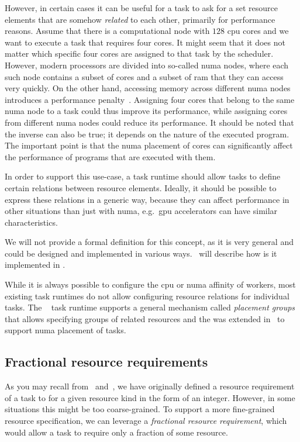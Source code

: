 However, in certain cases it can be useful for a task to ask for a set resource elements that are
somehow \emph{related} to each other, primarily for performance reasons. Assume that there
is a computational node with $128$ \gls{cpu} cores and we want to
execute a task that requires four cores. It might seem that it does not matter which specific four
cores are assigned to that task by the scheduler. However, modern processors are divided into
so-called \gls{numa} nodes, where each such node contains a subset of cores and a
subset of \gls{ram} that they can access very quickly. On the other hand, accessing
memory across different \gls{numa} nodes introduces a performance
penalty~\cite{numa_effect}. Assigning four cores that belong to the same
\gls{numa} node to a task could thus improve its performance, while assigning cores
from different \gls{numa} nodes could reduce its performance. It should be noted that
the inverse can also be true; it depends on the nature of the executed program. The important point
is that the \gls{numa} placement of cores can significantly affect the performance of
programs that are executed with them.

In order to support this use-case, a task runtime should allow tasks to define certain relations
between resource elements. Ideally, it should be possible to express these relations in a generic
way, because they can affect performance in other situations than just with
\gls{numa}, e.g.\ \gls{gpu} accelerators can have similar
characteristics.

We will not provide a formal definition for this concept, as it is very general and could be
designed and implemented in various ways.~ will describe how is it
implemented in \hyperqueue{}.

While it is always possible to configure the \gls{cpu} or \gls{numa}
affinity of workers, most existing task runtimes do not allow configuring resource relations for
individual tasks. The \ray{}~\cite{ray} task runtime supports a
general mechanism called \emph{placement groups} that allows specifying groups of related resources
and the \pycompss{} was extended in~\cite{pycompss_numa} to support
\gls{numa} placement of tasks.

\subsection{Fractional resource requirements}
As you may recall from~ and~, we have originally
defined a resource requirement of a task to for a given resource kind in the form of an integer.
However, in some situations this might be too coarse-grained. To support a more fine-grained
resource specification, we can leverage a \emph{fractional resource requirement}, which would allow a task to
require only a fraction of some resource.

